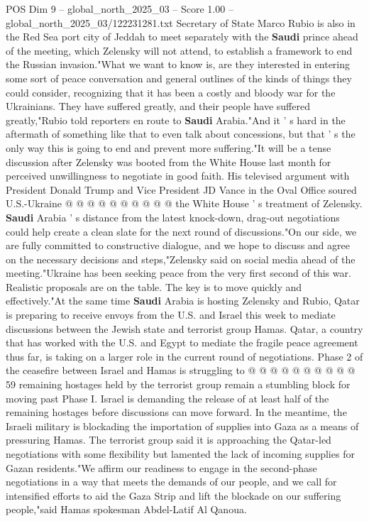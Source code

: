 \begin{textsample}{POS Dim 9 – global\_north\_2025\_03 – Score 1.00 – global\_north\_2025\_03/122231281.txt}  \label{ex:f9_pos_301}
Secretary of State Marco Rubio is also in the Red Sea port city of Jeddah to meet separately with the \textbf{Saudi} prince ahead of the meeting, which Zelensky will not attend, to establish a framework to end the Russian invasion."What we want to know is, are they interested in entering some sort of peace conversation and general outlines of the kinds of things they could consider, recognizing that it has been a costly and bloody war for the Ukrainians.
They have suffered greatly, and their people have suffered greatly,"Rubio told reporters en route to \textbf{Saudi} Arabia."And it ' s hard in the aftermath of something like that to even talk about concessions, but that ' s the only way this is going to end and prevent more suffering."It will be a tense discussion after Zelensky was booted from the White House last month for perceived unwillingness to negotiate in good faith.
His televised argument with President Donald Trump and Vice President JD Vance in the Oval Office soured U.S.-Ukraine @ @ @ @ @ @ @ @ @ @ the White House ' s treatment of Zelensky. \textbf{Saudi} Arabia ' s distance from the latest knock-down, drag-out negotiations could help create a clean slate for the next round of discussions."On our side, we are fully committed to constructive dialogue, and we hope to discuss and agree on the necessary decisions and steps,"Zelensky said on social media ahead of the meeting."Ukraine has been seeking peace from the very first second of this war.
Realistic proposals are on the table.
The key is to move quickly and effectively."At the same time \textbf{Saudi} Arabia is hosting Zelensky and Rubio, Qatar is preparing to receive envoys from the U.S. and Israel this week to mediate discussions between the Jewish state and terrorist group Hamas.
Qatar, a country that has worked with the U.S. and Egypt to mediate the fragile peace agreement thus far, is taking on a larger role in the current round of negotiations.
Phase 2 of the ceasefire between Israel and Hamas is struggling to @ @ @ @ @ @ @ @ @ @ 59 remaining hostages held by the terrorist group remain a stumbling block for moving past Phase I.
Israel is demanding the release of at least half of the remaining hostages before discussions can move forward.
In the meantime, the Israeli military is blockading the importation of supplies into Gaza as a means of pressuring Hamas.
The terrorist group said it is approaching the Qatar-led negotiations with some flexibility but lamented the lack of incoming supplies for Gazan residents."We affirm our readiness to engage in the second-phase negotiations in a way that meets the demands of our people, and we call for intensified efforts to aid the Gaza Strip and lift the blockade on our suffering people,"said Hamas spokesman Abdel-Latif Al Qanoua.

\end{textsample}
